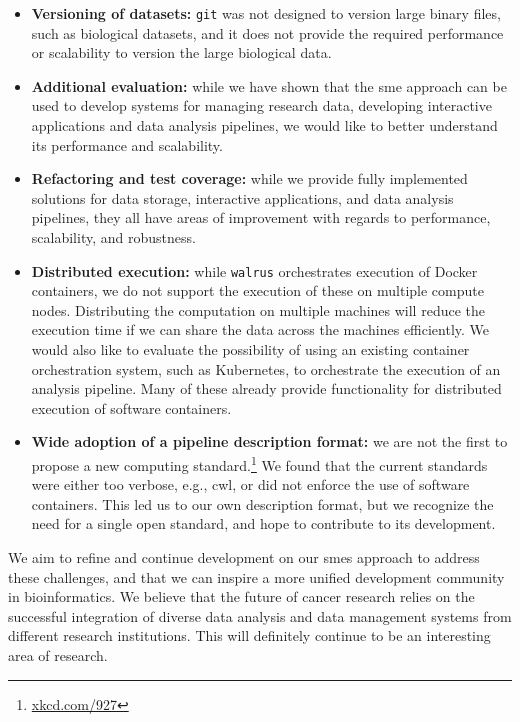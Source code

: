 \begin{itemize} 

\item \textbf{Versioning of datasets:} \texttt{git} was not designed to version
large binary files, such as biological datasets, and it does not provide the
required performance or scalability to version the large biological data. 

\item \textbf{Additional evaluation:} while we have shown that the \gls{sme}
approach can be used to develop systems for managing research data, developing
interactive applications and data analysis pipelines, we would like to
better understand its performance and scalability. 

\item \textbf{Refactoring and test coverage:} while we provide fully implemented
solutions for data storage, interactive applications, and data analysis
pipelines, they all have areas of improvement with regards to performance,
scalability, and robustness. 

\item \textbf{Distributed execution:} while \texttt{walrus} orchestrates
execution of Docker containers, we do not support the execution of these on
multiple compute nodes. Distributing the computation on multiple machines will
reduce the execution time if we can share the data across the
machines efficiently. We would also like to evaluate the possibility of using an
existing container orchestration system, such as
Kubernetes, to orchestrate the execution of an analysis pipeline. Many of these
already provide functionality for distributed execution of software containers. 

\item \textbf{Wide adoption of a pipeline description format:} we are not the
first to propose a new computing standard.\footnote{\url{xkcd.com/927}} We found
that the current standards were either too verbose, e.g., \gls{cwl}, or did not
enforce the use of software containers. This led us to our own description
format, but we recognize the need for a single open standard, and hope to
contribute to its development. 

\end{itemize} 

We aim to refine and continue development on our \glspl{sme} approach to address
these challenges, and that we can inspire a more unified development community
in bioinformatics. We believe that the future of cancer research relies on the
successful integration of diverse data analysis and data management systems from
different research institutions.  This will definitely continue to be an
interesting area of research.


